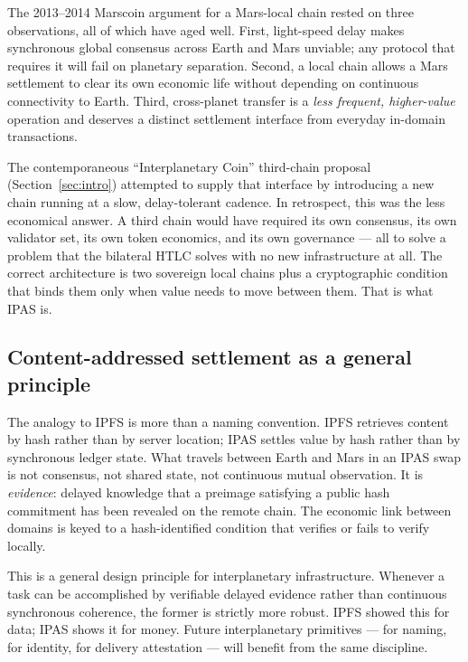 \documentclass[11pt]{article}
\begin{document}
The 2013--2014 Marscoin argument for a Mars-local chain rested on three observations, all of which have aged well. First, light-speed delay makes synchronous global consensus across Earth and Mars unviable; any protocol that requires it will fail on planetary separation. Second, a local chain allows a Mars settlement to clear its own economic life without depending on continuous connectivity to Earth. Third, cross-planet transfer is a \emph{less frequent, higher-value} operation and deserves a distinct settlement interface from everyday in-domain transactions.

The contemporaneous ``Interplanetary Coin'' third-chain proposal (Section~\ref{sec:intro}) attempted to supply that interface by introducing a new chain running at a slow, delay-tolerant cadence. In retrospect, this was the less economical answer. A third chain would have required its own consensus, its own validator set, its own token economics, and its own governance --- all to solve a problem that the bilateral HTLC solves with no new infrastructure at all. The correct architecture is two sovereign local chains plus a cryptographic condition that binds them only when value needs to move between them. That is what IPAS is.

\subsection{Content-addressed settlement as a general principle}

The analogy to IPFS \citep{ipfs2014} is more than a naming convention. IPFS retrieves content by hash rather than by server location; IPAS settles value by hash rather than by synchronous ledger state. What travels between Earth and Mars in an IPAS swap is not consensus, not shared state, not continuous mutual observation. It is \emph{evidence}: delayed knowledge that a preimage satisfying a public hash commitment has been revealed on the remote chain. The economic link between domains is keyed to a hash-identified condition that verifies or fails to verify locally.

This is a general design principle for interplanetary infrastructure. Whenever a task can be accomplished by verifiable delayed evidence rather than continuous synchronous coherence, the former is strictly more robust. IPFS showed this for data; IPAS shows it for money. Future interplanetary primitives --- for naming, for identity, for delivery attestation --- will benefit from the same discipline.
\end{document}

